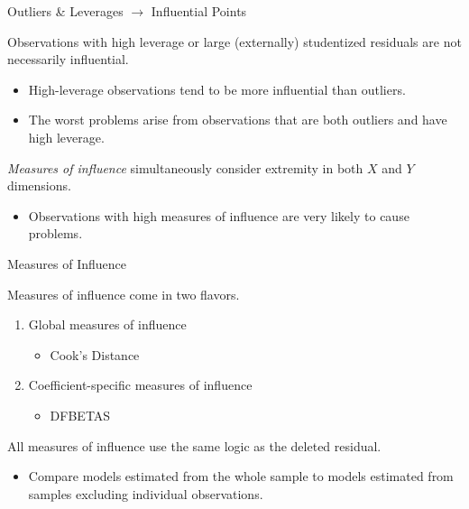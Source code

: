 \documentclass[10pt]{beamer}\usepackage[]{graphicx}\usepackage[]{color}
\begin{document}
\watermarkon %

\begin{frame}{Outliers \& Leverages $\rightarrow$ Influential Points}

  Observations with high leverage or large (externally) studentized residuals
  are not necessarily influential.
  \vc
  \begin{itemize}
  \item High-leverage observations tend to be more influential than outliers.
    \vc
  \item The worst problems arise from observations that are both outliers and
    have high leverage.
  \end{itemize}
  \vb
  \emph{Measures of influence} simultaneously consider extremity in both $X$
  and $Y$ dimensions.
  \vc
  \begin{itemize}
  \item Observations with high measures of influence are very likely to cause
    problems.
  \end{itemize}

\end{frame}


\begin{frame}{Measures of Influence}

  Measures of influence come in two flavors.
  \vb
  \begin{enumerate}
  \item Global measures of influence
    \vc
    \begin{itemize}
    \item Cook's Distance
    \end{itemize}
    \vb
  \item Coefficient-specific measures of influence
    \vc
    \begin{itemize}
    \item DFBETAS
    \end{itemize}
  \end{enumerate}
  \vb
  All measures of influence use the same logic as the deleted residual.
  \vc
  \begin{itemize}
  \item Compare models estimated from the whole sample to models estimated from
    samples excluding individual observations.
  \end{itemize}
\end{frame}
\end{document}
